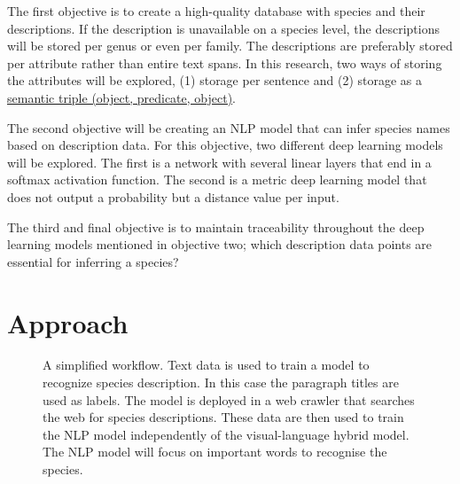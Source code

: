 \documentclass[a4paper, 12pt, oneside]{book} %
\begin{document}
The first objective is to create a high-quality database with species and their descriptions.
If the description is unavailable on a species level, the descriptions will be stored per genus or even per family.
The descriptions are preferably stored per attribute rather than entire text spans.
In this research, two ways of storing the attributes will be explored, (1) storage per sentence and (2) storage as a \href{https://www.ontotext.com/knowledgehub/fundamentals/what-is-a-knowledge-graph/}{semantic triple (object, predicate, object)}.

The second objective will be creating an NLP model that can infer species names based on description data. 
For this objective, two different deep learning models will be explored.
The first is a network with several linear layers that end in a softmax activation function.
The second is a metric deep learning model that does not output a probability but a distance value per input.

The third and final objective is to maintain traceability throughout the deep learning models mentioned in objective two; which description data points are essential for inferring a species?
\section{Approach} 

\begin{figure} [t]
    \centering
    \vspace{-2cm}
    \caption{A simplified workflow. Text data is used to train a model to recognize species description. In this case the paragraph titles are used as labels. The model is deployed in a web crawler that searches the web for species descriptions. These data are then used to train the NLP model independently of the visual-language hybrid model. The NLP model will focus on important words to recognise the species.}
    \label{fig:workflow}
\end{figure}
\end{document}
